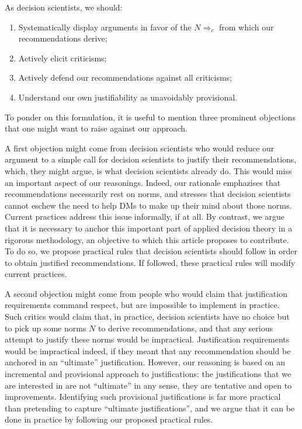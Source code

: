 \documentclass[preprint, french, english, 11pt, authoryear]{elsarticle}%
\begin{document}
As decision scientists, we should:
\begin{enumerate}[label=\roman*.]
	\item Systematically display arguments in favor of the $N ⇒_c$ from which our recommendations derive;
	\item Actively elicit criticisms;
	\item Actively defend our recommendations against all criticisms;
	\item Understand our own justifiability as unavoidably provisional.
\end{enumerate}

To ponder on this formulation, it is useful to mention three prominent objections that one might want to raise against our approach.

A first objection might come from decision scientists who would reduce our argument to a simple call for decision scientists to justify their recommendations, which, they might argue, is what decision scientists already do. This would miss an important aspect of our reasonings. Indeed, our rationale emphazises that recommendations necessarily rest on norms, and stresses that decision scientists cannot eschew the need to help \acp{DM} to make up their mind about those norms. Current practices address this issue informally, if at all. By contrast, we argue that it is necessary to anchor this important part of applied decision theory in a rigorous methodology, an objective to which this article proposes to contribute. To do so, we propose practical rules that decision scientists should follow in order to obtain justified recommendations. If followed, these practical rules will modify current practices.

A second objection might come from people who would claim that justification requirements command respect, but are impossible to implement in practice. Such critics would claim that, in practice, decision scientists have no choice but to pick up some norms $N$ to derive recommendations, and that any serious attempt to justify these norms would be impractical. Justification requirements would be impractical indeed, if they meant that any recommendation should be anchored in an “ultimate” justification. However, our reasoning is based on an incremental and provisional approach to justifications: the justifications that we are interested in are not ``ultimate'' in any sense, they are tentative and open to improvements. Identifying such provisional justifications is far more practical than pretending to capture ``ultimate justifications'', and we argue that it can be done in practice by following our proposed practical rules.
\end{document}
